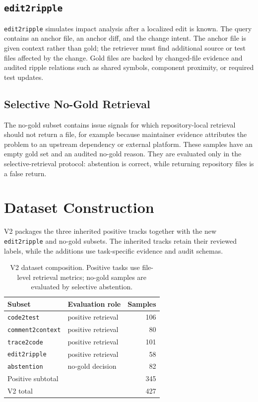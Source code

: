 \documentclass[11pt]{article}
\newcommand{\code}[1]{\texttt{#1}}
\begin{document}
\subsection{\code{edit2ripple}}

\code{edit2ripple} simulates impact analysis after a localized edit is known. The query contains an anchor file, an anchor diff, and the change intent. The anchor file is given context rather than gold; the retriever must find additional source or test files affected by the change. Gold files are backed by changed-file evidence and audited ripple relations such as shared symbols, component proximity, or required test updates.

\subsection{Selective No-Gold Retrieval}

The no-gold subset contains issue signals for which repository-local retrieval should not return a file, for example because maintainer evidence attributes the problem to an upstream dependency or external platform. These samples have an empty gold set and an audited no-gold reason. They are evaluated only in the selective-retrieval protocol: abstention is correct, while returning repository files is a false return.

\section{Dataset Construction}

V2 packages the three inherited positive tracks together with the new \code{edit2ripple} and no-gold subsets. The inherited tracks retain their reviewed labels, while the additions use task-specific evidence and audit schemas.

\begin{table}[t]
\centering
\caption{V2 dataset composition. Positive tasks use file-level retrieval metrics; no-gold samples are evaluated by selective abstention.}
\label{tab:dataset-composition}
\begin{tabular}{llr}
\toprule
Subset & Evaluation role & Samples \\
\midrule
\code{code2test} & positive retrieval & 106 \\
\code{comment2context} & positive retrieval & 80 \\
\code{trace2code} & positive retrieval & 101 \\
\code{edit2ripple} & positive retrieval & 58 \\
\code{abstention} & no-gold decision & 82 \\
\midrule
Positive subtotal & & 345 \\
V2 total & & 427 \\
\bottomrule
\end{tabular}
\end{table}
\end{document}
